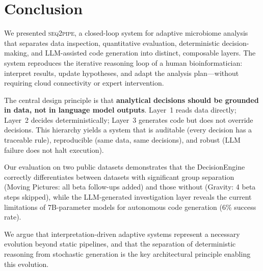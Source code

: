 \documentclass[11pt,a4paper]{article}
\newcommand{\seqpipe}{\textsc{seq2pipe}}
\begin{document}
\section{Conclusion}
\label{sec:conclusion}

We presented \seqpipe, a closed-loop system for adaptive microbiome
analysis that separates data inspection, quantitative evaluation,
deterministic decision-making, and LLM-assisted code generation
into distinct, composable layers.
The system reproduces the iterative reasoning loop of a human
bioinformatician: interpret results, update hypotheses, and
adapt the analysis plan---without requiring cloud connectivity
or expert intervention.

The central design principle is that \textbf{analytical decisions
should be grounded in data, not in language model outputs}.
Layer~1 reads data directly; Layer~2 decides deterministically;
Layer~3 generates code but does not override decisions.
This hierarchy yields a system that is auditable (every decision
has a traceable rule), reproducible (same data, same decisions),
and robust (LLM failure does not halt execution).

Our evaluation on two public datasets demonstrates that the
DecisionEngine correctly differentiates between datasets with
significant group separation (Moving Pictures: all beta follow-ups added)
and those without (Gravity: 4 beta steps skipped),
while the LLM-generated investigation layer reveals the current
limitations of 7B-parameter models for autonomous code generation
(6\% success rate).

We argue that interpretation-driven adaptive systems represent a
necessary evolution beyond static pipelines, and that the separation
of deterministic reasoning from stochastic generation is the key
architectural principle enabling this evolution.



\end{document}
